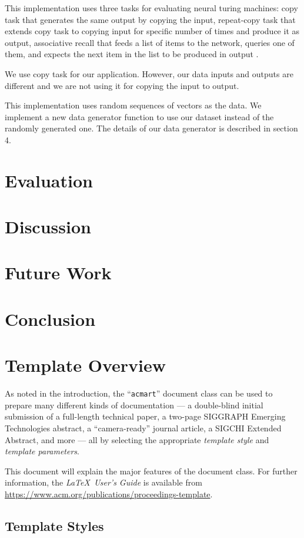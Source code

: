 \documentclass[acmsmall]{acmart}
\begin{document}
This implementation uses three tasks for evaluating neural turing machines: copy task that generates the same output by copying the input, repeat-copy task that extends copy task to copying input for specific number of times and produce it as output, associative recall that feeds a list of items to the network, queries one of them, and expects the next item in the list to be produced in output \cite{}.

We use copy task for our application. However, our data inputs and outputs are different and we are not using it for copying the input to output.

This implementation uses random sequences of vectors as the data. We implement a new data generator function to use our dataset instead of the randomly generated one. The details of our data generator is described in section 4.
\section{Evaluation}
\section{Discussion}
\section{Future Work}
\section{Conclusion}

\section{Template Overview}
As noted in the introduction, the ``\verb|acmart|'' document class can
be used to prepare many different kinds of documentation --- a
double-blind initial submission of a full-length technical paper, a
two-page SIGGRAPH Emerging Technologies abstract, a ``camera-ready''
journal article, a SIGCHI Extended Abstract, and more --- all by
selecting the appropriate {\itshape template style} and {\itshape
  template parameters}.

This document will explain the major features of the document
class. For further information, the {\itshape \LaTeX\ User's Guide} is
available from
\url{https://www.acm.org/publications/proceedings-template}.

\subsection{Template Styles}
\end{document}
